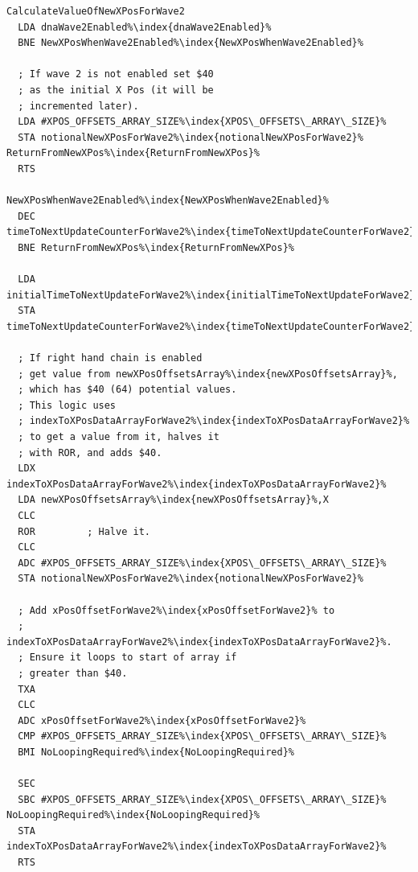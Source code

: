 \begin{minipage}[b]{0.50\linewidth}
\centering
\begin{lstlisting}[escapechar=\%,basicstyle=\tiny\ttfamily, caption=Calculate a notional X Pos value for Wave 2. This routine\index{routine} is called by the one on the
right\, its return value is \icode{notionalNewXPosForWave2\index{notionalNewXPosForWave2}}. ]
CalculateValueOfNewXPosForWave2
  LDA dnaWave2Enabled%\index{dnaWave2Enabled}%
  BNE NewXPosWhenWave2Enabled%\index{NewXPosWhenWave2Enabled}%

  ; If wave 2 is not enabled set $40
  ; as the initial X Pos (it will be
  ; incremented later).
  LDA #XPOS_OFFSETS_ARRAY_SIZE%\index{XPOS\_OFFSETS\_ARRAY\_SIZE}%
  STA notionalNewXPosForWave2%\index{notionalNewXPosForWave2}%
ReturnFromNewXPos%\index{ReturnFromNewXPos}%   
  RTS

NewXPosWhenWave2Enabled%\index{NewXPosWhenWave2Enabled}%   
  DEC timeToNextUpdateCounterForWave2%\index{timeToNextUpdateCounterForWave2}%
  BNE ReturnFromNewXPos%\index{ReturnFromNewXPos}%

  LDA initialTimeToNextUpdateForWave2%\index{initialTimeToNextUpdateForWave2}%
  STA timeToNextUpdateCounterForWave2%\index{timeToNextUpdateCounterForWave2}%

  ; If right hand chain is enabled
  ; get value from newXPosOffsetsArray%\index{newXPosOffsetsArray}%,
  ; which has $40 (64) potential values. 
  ; This logic uses 
  ; indexToXPosDataArrayForWave2%\index{indexToXPosDataArrayForWave2}% 
  ; to get a value from it, halves it
  ; with ROR, and adds $40.
  LDX indexToXPosDataArrayForWave2%\index{indexToXPosDataArrayForWave2}%
  LDA newXPosOffsetsArray%\index{newXPosOffsetsArray}%,X
  CLC
  ROR         ; Halve it.
  CLC
  ADC #XPOS_OFFSETS_ARRAY_SIZE%\index{XPOS\_OFFSETS\_ARRAY\_SIZE}%
  STA notionalNewXPosForWave2%\index{notionalNewXPosForWave2}%

  ; Add xPosOffsetForWave2%\index{xPosOffsetForWave2}% to
  ; indexToXPosDataArrayForWave2%\index{indexToXPosDataArrayForWave2}%.
  ; Ensure it loops to start of array if
  ; greater than $40. 
  TXA
  CLC
  ADC xPosOffsetForWave2%\index{xPosOffsetForWave2}%
  CMP #XPOS_OFFSETS_ARRAY_SIZE%\index{XPOS\_OFFSETS\_ARRAY\_SIZE}%
  BMI NoLoopingRequired%\index{NoLoopingRequired}%

  SEC
  SBC #XPOS_OFFSETS_ARRAY_SIZE%\index{XPOS\_OFFSETS\_ARRAY\_SIZE}%
NoLoopingRequired%\index{NoLoopingRequired}%   
  STA indexToXPosDataArrayForWave2%\index{indexToXPosDataArrayForWave2}%
  RTS
\end{lstlisting}
\end{minipage}
